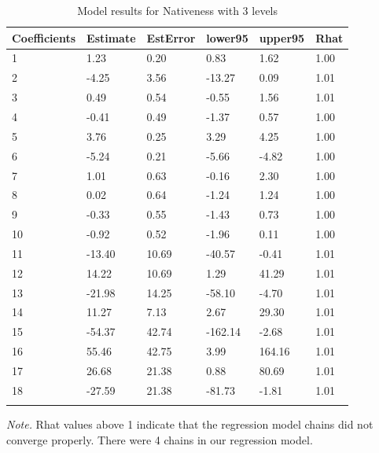 \documentclass[review]{elsarticle} %
\begin{document}
\begin{table}[hbt!]

\begin{center}
\begin{threeparttable}

\caption{\label{tab:unnamed-chunk-4}Model results for Nativeness with 3 levels}

\small{

\begin{tabular}{llllll}
\toprule
Coefficients & \multicolumn{1}{c}{Estimate} & \multicolumn{1}{c}{EstError} & \multicolumn{1}{c}{lower95} & \multicolumn{1}{c}{upper95} & \multicolumn{1}{c}{Rhat}\\
\midrule
1 & 1.23 & 0.20 & 0.83 & 1.62 & 1.00\\
2 & -4.25 & 3.56 & -13.27 & 0.09 & 1.01\\
3 & 0.49 & 0.54 & -0.55 & 1.56 & 1.01\\
4 & -0.41 & 0.49 & -1.37 & 0.57 & 1.00\\
5 & 3.76 & 0.25 & 3.29 & 4.25 & 1.00\\
6 & -5.24 & 0.21 & -5.66 & -4.82 & 1.00\\
7 & 1.01 & 0.63 & -0.16 & 2.30 & 1.00\\
8 & 0.02 & 0.64 & -1.24 & 1.24 & 1.00\\
9 & -0.33 & 0.55 & -1.43 & 0.73 & 1.00\\
10 & -0.92 & 0.52 & -1.96 & 0.11 & 1.00\\
11 & -13.40 & 10.69 & -40.57 & -0.41 & 1.01\\
12 & 14.22 & 10.69 & 1.29 & 41.29 & 1.01\\
13 & -21.98 & 14.25 & -58.10 & -4.70 & 1.01\\
14 & 11.27 & 7.13 & 2.67 & 29.30 & 1.01\\
15 & -54.37 & 42.74 & -162.14 & -2.68 & 1.01\\
16 & 55.46 & 42.75 & 3.99 & 164.16 & 1.01\\
17 & 26.68 & 21.38 & 0.88 & 80.69 & 1.01\\
18 & -27.59 & 21.38 & -81.73 & -1.81 & 1.01\\
\bottomrule
\addlinespace
\end{tabular}

}

\begin{tablenotes}[para]
\normalsize{\textit{Note.} Rhat values above 1 indicate that the regression model chains did not converge properly. There were 4 chains in our regression model.}
\end{tablenotes}

\end{threeparttable}
\end{center}

\end{table}

\clearpage

\renewcommand\refname{References}

\end{document}
